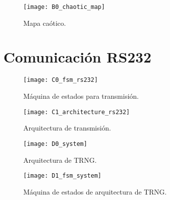 	\begin{figure}[hbtp]
		\caption{Mapa caótico.}
		\centering
		\texttt{[image: B0\_chaotic\_map]}
		\label{fig:B0_chaotic_map}
	\end{figure}
	
	
	
	\section{Comunicación RS232}
	
	\begin{figure}[hbtp]
		\caption{Máquina de estados para transmisión.}
		\centering
		\texttt{[image: C0\_fsm\_rs232]}
		\label{fig:C0_fsm_rs232}
	\end{figure}	
	
	
	\begin{figure}[hbtp]
		\caption{Arquitectura de transmisión.}
		\centering
		\texttt{[image: C1\_architecture\_rs232]}
		\label{fig:C1_architecture_rs232}
	\end{figure}
	
	\begin{figure}[hbtp]
		\caption{Arquitectura de TRNG.}
		\centering
		\texttt{[image: D0\_system]}
		\label{fig:D0_system}
	\end{figure}
	
	\begin{figure}[hbtp]
		\caption{Máquina de estados de arquitectura de TRNG.}
		\centering
		\texttt{[image: D1\_fsm\_system]}
		\label{fig:D1_fsm_system}
	\end{figure}
	

